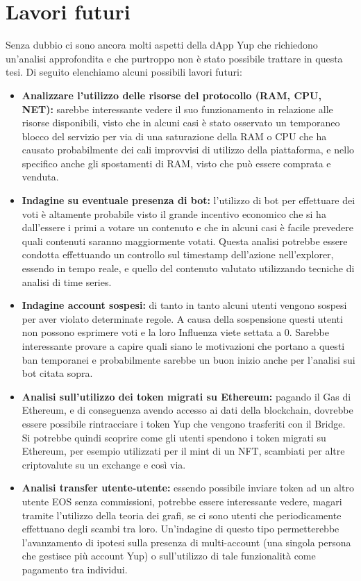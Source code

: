 \section{Lavori futuri}
Senza dubbio ci sono ancora molti aspetti della dApp Yup che richiedono un'analisi approfondita e che purtroppo non è stato possibile trattare in questa tesi. Di seguito elenchiamo alcuni possibili lavori futuri:

\begin{itemize}
    \item \textbf{Analizzare l'utilizzo delle risorse del protocollo (RAM, CPU, NET):} sarebbe interessante vedere il suo funzionamento in relazione alle risorse disponibili, visto che in alcuni casi è stato osservato un temporaneo blocco del servizio per via di una saturazione della RAM o CPU che ha causato probabilmente dei cali improvvisi di utilizzo della piattaforma, e nello specifico anche gli spostamenti di RAM, visto che può essere comprata e venduta.
    \item \textbf{Indagine su eventuale presenza di bot:} l'utilizzo di bot per effettuare dei voti è altamente probabile visto il grande incentivo economico che si ha dall'essere i primi a votare un contenuto e che in alcuni casi è facile prevedere quali contenuti saranno maggiormente votati. Questa analisi potrebbe essere condotta effettuando un controllo sul timestamp dell'azione nell'explorer, essendo in tempo reale, e quello del contenuto valutato utilizzando tecniche di analisi di time series.
    \item \textbf{Indagine account sospesi:} di tanto in tanto alcuni utenti vengono sospesi per aver violato determinate regole. A causa della sospensione questi utenti non possono esprimere voti e la loro Influenza viete settata a 0. Sarebbe interessante provare a capire quali siano le motivazioni che portano a questi ban temporanei e probabilmente sarebbe un buon inizio anche per l'analisi sui bot citata sopra.
    \item \textbf{Analisi sull'utilizzo dei token migrati su Ethereum:} pagando il Gas di Ethereum, e di conseguenza avendo accesso ai dati della blockchain, dovrebbe essere possibile rintracciare i token Yup che vengono trasferiti con il Bridge. Si potrebbe quindi scoprire come gli utenti spendono i token migrati su Ethereum, per esempio utilizzati per il mint di un NFT, scambiati per altre criptovalute su un exchange e così via.
    \item \textbf{Analisi transfer utente-utente:} essendo possibile inviare token ad un altro utente EOS senza commissioni, potrebbe essere interessante vedere, magari tramite l'utilizzo della teoria dei grafi, se ci sono utenti che periodicamente effettuano degli scambi tra loro. Un'indagine di questo tipo permetterebbe l'avanzamento di ipotesi sulla presenza di multi-account (una singola persona che gestisce più account Yup) o sull'utilizzo di tale funzionalità come pagamento tra individui.
\end{itemize}